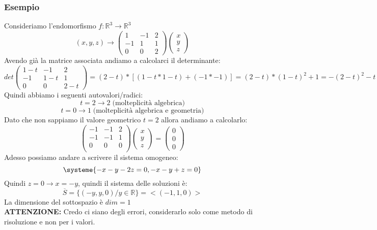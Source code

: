 \subsubsection{Esempio}
Consideriamo l'endomorfismo $f: \mathbb{R}^3 \rightarrow \mathbb{R}^3$
$$ (x,y,z) \rightarrow \begin{pmatrix}
1 & -1 & 2 \\
-1 & 1 & 1 \\
0 & 0 & 2
\end{pmatrix}
\begin{pmatrix}
x \\ y \\ z
\end{pmatrix} $$
Avendo già la matrice associata andiamo a calcolarci il determinante:
$$ 
det 
\begin{pmatrix}
1-t & -1 & 2 \\
-1 & 1-t & 1 \\
0 & 0 & 2-t
\end{pmatrix}
= (2-t)*[(1-t*1-t)+(-1*-1)] = (2-t)*(1-t)^2+1 = -(2-t)^2-t
$$
Quindi abbiamo i seguenti autovalori/radici:
$$t=2 \rightarrow 2 \; \text{(molteplicità algebrica)} $$
$$t=0 \rightarrow 1 \; \text{(molteplicità algebrica e geometria)} $$
Dato che non sappiamo il valore geometrico $t=2$ allora andiamo a calcolarlo:
$$ \begin{pmatrix}
-1 & -1 & 2 \\
-1 & -1 & 1 \\
0 & 0 & 0 \\
\end{pmatrix}
\begin{pmatrix}
x \\ y \\ z
\end{pmatrix} = \begin{pmatrix}
0 \\ 0 \\ 0
\end{pmatrix} $$
Adesso possiamo andare a scrivere il sistema omogeneo:
$$ 
\systeme{-x-y-2z=0, -x-y+z=0}
$$
Quindi $z=0 \rightarrow x=-y$, quindi il sistema delle soluzioni è:
$$ \overline{S}=\{(-y,y,0)/ y \in \mathbb{R} \} = <(-1,1,0)> $$
La dimensione del sottospazio è $dim = 1$\\
\textbf{ATTENZIONE:} Credo ci siano degli errori, considerarlo solo come metodo di risoluzione e non per i valori.





